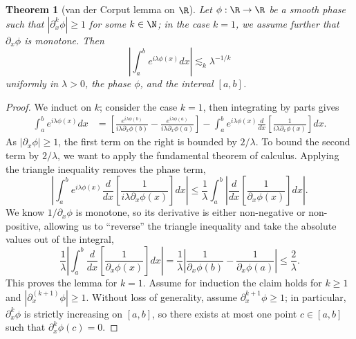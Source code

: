 \documentclass[reqno]{amsart}
\newtheorem{theorem}{Theorem}
\theoremstyle{definition}
\theoremstyle{remark}
\begin{document}
\begin{theorem}[van der Corput lemma on $\R$]
	Let $\phi : \R \to \R$ be a smooth phase such that $|\partial_x^k \phi | \geq 1$ for some $k \in \N$; in the case $k = 1$, we assume further that $\partial_x \phi$ is monotone. Then 
		\[ \left| \int_a^b e^{i \lambda \phi(x)} dx \right| \lesssim_k \lambda^{-1/k} \]
	uniformly in $\lambda > 0$, the phase $\phi$, and the interval $[a, b]$. 	
\end{theorem}

\begin{proof}
	We induct on $k$; consider the case $k = 1$, then integrating by parts gives
		\begin{align*}
			\int_a^b e^{i \lambda \phi(x)} dx
				&=  \left[ \frac{e^{i \lambda \phi(b)}}{i \lambda \partial_x\phi(b)} - \frac{e^{i \lambda \phi(a)}}{i \lambda \partial_x\phi(a)} \right] - \int_a^b e^{i \lambda \phi(x)} \frac{d}{dx} \left[ \frac{1}{i \lambda \partial_x\phi (x)} \right] dx.
		\end{align*}	
	As $|\partial_x\phi| \geq 1$, the first term on the right is bounded by $2/\lambda$. To bound the second term by $2/\lambda$, we want to apply the fundamental theorem of calculus. Applying the triangle inequality removes the phase term, 
		\[ \left| \int_a^b e^{i \lambda \phi(x)} \frac{d}{dx} \left[ \frac{1}{i \lambda\partial_x\phi (x)} \right] dx \right| \leq \frac1\lambda\int_a^b \left| \frac{d}{dx} \left[ \frac{1}{\partial_x\phi(x)} \right] dx \right|. \]
	We know $1/\partial_x\phi$ is monotone, so its derivative is either non-negative or non-positive, allowing us to ``reverse'' the triangle inequality and take the absolute values out of the integral, 
		\[	\frac1\lambda \left| \int_a^b \frac{d}{dx} \left[ \frac{1}{\partial_x\phi(x)} \right] dx\right| = \frac1\lambda\left| \frac{1}{\partial_x\phi(b)} - \frac{1}{\partial_x\phi(a)} \right| \leq \frac2\lambda.\]
	This proves the lemma for $k = 1$.  Assume for induction the claim holds for $k \geq 1$ and $|\partial^{(k + 1)}_x \phi| \geq 1$. Without loss of generality, assume $\partial_x^{k + 1}\phi \geq 1$; in particular, $\partial_x^k \phi$ is strictly increasing on $[a, b]$, so there exists at most one point $c \in [a, b]$ such that $\partial_x^k \phi (c) = 0$. 


\end{proof}
\end{document}
